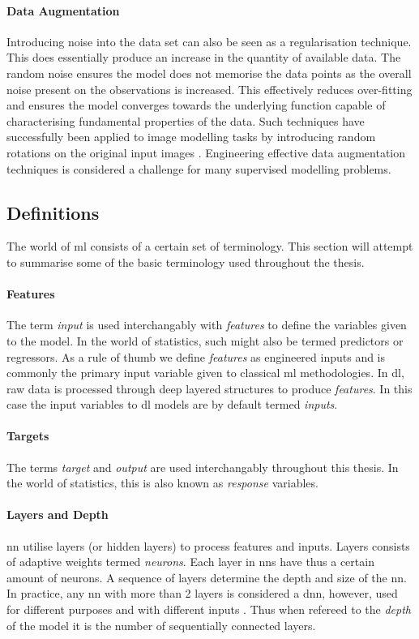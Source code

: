 \paragraph{Data Augmentation}
Introducing noise into the data set can also be seen as a regularisation technique. This does essentially produce an increase in the quantity of available data. The random noise ensures the model does not memorise the data points as the overall noise present on the observations is increased. This effectively reduces over-fitting and ensures the model converges towards the underlying function capable of characterising fundamental properties of the data. Such techniques have successfully been applied to image modelling tasks by introducing random rotations on the original input images \cite{Shorten2019ALearning}. Engineering effective data augmentation techniques is considered a challenge for many supervised modelling problems. 

\subsection{Definitions}
The world of \gls{ml} consists of a certain set of terminology. This section will attempt to summarise some of the basic terminology used throughout the thesis.

\paragraph{Features}
The term \emph{input} is used interchangably with \emph{features} to define the variables given to the model. In the world of statistics, such might also be termed predictors or regressors. As a rule of thumb we define \emph{features} as engineered inputs and is commonly the primary input variable given to classical \gls{ml} methodologies. In \gls{dl}, raw data is processed through deep layered structures to produce \emph{features}. In this case the input variables to \gls{dl} models are by default termed \emph{inputs}. 

\paragraph{Targets}
The terms \emph{target} and \emph{output} are used interchangably throughout this thesis. In the world of statistics, this is also known as \emph{response} variables. 

\paragraph{Layers and Depth}
\gls{nn} utilise layers (or hidden layers) to process features and inputs. Layers consists of adaptive weights termed \emph{neurons}. Each layer in \glspl{nn} have thus a certain amount of neurons. A sequence of layers determine the depth and size of the \gls{nn}. In practice, any \gls{nn} with more than 2 layers is considered a \gls{dnn}, however, used for different purposes and with different inputs \cite{M.Bishop2006}. Thus when refereed to the \emph{depth} of the model it is the number of sequentially connected layers. 

